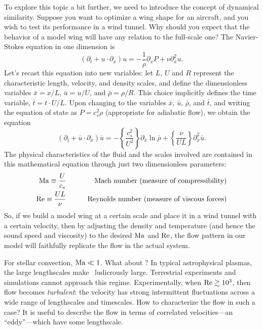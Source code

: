 To explore this topic a bit further, we need to introduce the concept of dynamical similarity.  Suppose you want to optimize a wing shape for an aircraft, and you wish to test its performance in a wind tunnel.  Why should you expect that the behavior of a model wing will have any relation to the full-scale one?  The Navier-Stokes equation in one dimension is
\[
	(\partial_{t} + u\cdot\partial_{x})u = -\frac{1}{\rho}\partial_{x}P + \nu \partial_{x}^{2}u.
\]
Let's recast this equation into new variables: let $L$, $U$ and $R$ represent the characteristic length, velocity, and density scales, and define the dimensionless variables $\bar{x} = x / L$, $\bar{u} = u / U$, and $\bar{\rho} = \rho/R$. This choice implicitly defines the time variable, $\bar{t} = t\cdot U/L$. Upon changing to the variables $\bar{x}$, $\bar{u}$, $\bar{\rho}$, and $\bar{t}$, and writing the equation of state as $P = c_{s}^{2} \rho$ (appropriate for adiabatic flow), we obtain the equation
\begin{equation}\label{e.scaled-NS}
	(\partial_{\bar{t}} + \bar{u}\cdot\partial_{\bar{x}})\bar{u} = -\left\{\frac{c_{s}^{2}}{U^{2}}\right\}\partial_{\bar{x}}\ln\bar{\rho} + \left\{\frac{\nu}{UL}\right\} \partial_{\bar{x}}^{2}\bar{u}.
\end{equation}
The physical characteristics of the fluid and the scales involved are contained in this mathematical equation through just two dimensionless parameters:
\begin{eqnarray*}
 \mathrm{Ma}\equiv\frac{U}{c_{s}}&\qquad& \textrm{Mach number (measure of compressibility)}\\
 \mathrm{Re}\equiv \frac{UL}{\nu} &\qquad& \textrm{Reynolds number (measure of viscous forces)}
\end{eqnarray*}
So, if we build a model wing at a certain scale and place it in a wind tunnel with a certain velocity, then by adjusting the density and temperature (and hence the sound speed and viscosity) to the desired $\mathrm{Ma}$ and $\mathrm{Re}$, the flow pattern in our model will faithfully replicate the flow in the actual system.

For stellar  convection, $\mathrm{Ma}\ll 1$. What about \Rey?  In typical astrophysical plasmas, the large lengthscales make \Rey\ ludicrously large. Terrestrial experiments and simulations cannot approach this regime. Experimentally, when $\mathrm{Re} \gtrsim 10^{3}$, then flow becomes \emph{turbulent}: the velocity has strong intermittent fluctuations across a wide range of lengthscales and timescales.  How to characterize the flow in such a case? It is useful to describe the flow in terms of correlated velocities---an ``eddy''---which have some lengthscale.

